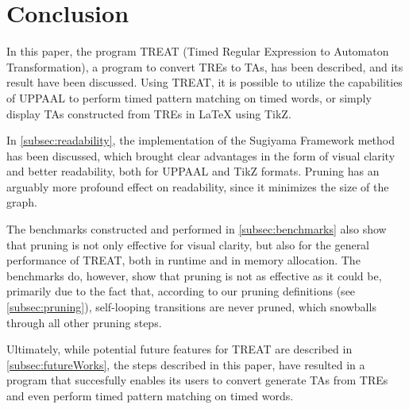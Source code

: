 \section{Conclusion}


In this paper, the program TREAT (Timed Regular Expression to Automaton Transformation), a program to convert TREs to TAs, has been described, and its result have been discussed.
Using TREAT, it is possible to utilize the capabilities of UPPAAL to perform timed pattern matching on timed words, or simply display TAs constructed from TREs in LaTeX using TikZ.

In \cref{subsec:readability}, the implementation of the Sugiyama Framework method has been discussed, which brought clear advantages in the form of visual clarity and better readability, both for UPPAAL and TikZ formats.
Pruning has an arguably more profound effect on readability, since it minimizes the size of the graph.

The benchmarks constructed and performed in \cref{subsec:benchmarks} also show that pruning is not only effective for visual clarity, but also for the general performance of TREAT, both in runtime and in memory allocation.
The benchmarks do, however, show that pruning is not as effective as it could be, primarily due to the fact that, according to our pruning definitions (see \cref{subsec:pruning}), self-looping transitions are never pruned, which snowballs through all other pruning steps.

Ultimately, while potential future features for TREAT are described in \cref{subsec:futureWorks}, the steps described in this paper, have resulted in a program that succesfully enables its users to convert generate TAs from TREs and even perform timed pattern matching on timed words.